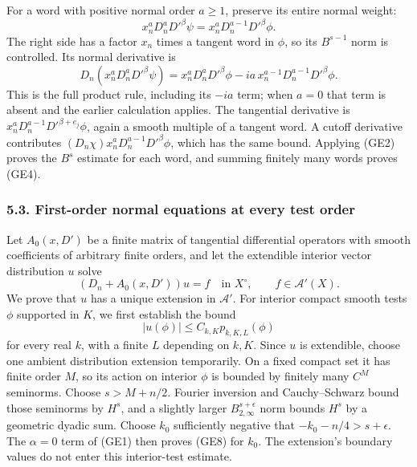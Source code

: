 \documentclass[
  11pt,
]{article}
\begin{document}
For a word with positive normal order \(a\ge1\), preserve its entire
normal weight: \[
 x_n^aD_n^aD'^\beta\psi
   =x_n^aD_n^{a-1}D'^\beta\phi.
 \tag{GE5}
\] The right side has a factor \(x_n\) times a tangent word in \(\phi\),
so its \(B^{s-1}\) norm is controlled. Its normal derivative is \[
 D_n(x_n^aD_n^aD'^\beta\psi)
  =x_n^aD_n^aD'^\beta\phi
      -ia\,x_n^{a-1}D_n^{a-1}D'^\beta\phi.
 \tag{GE6}
\] This is the full product rule, including its \(-ia\) term; when
\(a=0\) that term is absent and the earlier calculation applies. The
tangential derivative is \(x_n^aD_n^{a-1}D'^{\beta+e_j}\phi\), again a
smooth multiple of a tangent word. A cutoff derivative contributes
\((D_n\chi)x_n^aD_n^{a-1}D'^\beta\phi\), which has the same bound.
Applying (GE2) proves the \(B^s\) estimate for each word, and summing
finitely many words proves (GE4).

\subsubsection{5.3. First-order normal equations at every test
order}\label{first-order-normal-equations-at-every-test-order}

Let \(A_0(x,D')\) be a finite matrix of tangential differential
operators with smooth coefficients of arbitrary finite orders, and let
the extendible interior vector distribution \(u\) solve \[
 (D_n+A_0(x,D'))u=f\quad\text{in }X^\circ,
 \qquad f\in\mathcal A'(X).
 \tag{GE7}
\] We prove that \(u\) has a unique extension in \(\mathcal A'\). For
interior compact smooth tests \(\phi\) supported in \(K\), we first
establish the bound \[
 |u(\phi)|\le C_{k,K}p_{k,K,L}(\phi)
 \tag{GE8}
\] for every real \(k\), with a finite \(L\) depending on \(k,K\). Since
\(u\) is extendible, choose one ambient distribution extension
temporarily. On a fixed compact set it has finite order \(M\), so its
action on interior \(\phi\) is bounded by finitely many \(C^M\)
seminorms. Choose \(s>M+n/2\). Fourier inversion and Cauchy--Schwarz
bound those seminorms by \(H^s\), and a slightly larger
\(B^{s+\epsilon}_{2,\infty}\) norm bounds \(H^s\) by a geometric dyadic
sum. Choose \(k_0\) sufficiently negative that \(-k_0-n/4>s+\epsilon\).
The \(\alpha=0\) term of (GE1) then proves (GE8) for \(k_0\). The
extension's boundary values do not enter this interior-test estimate.
\end{document}
